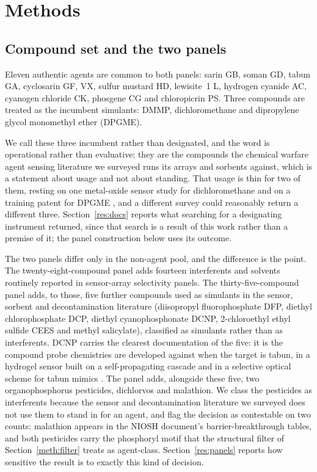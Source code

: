 \documentclass[1p,times]{elsarticle}
\begin{document}
\section{Methods}

\subsection{Compound set and the two panels}
\label{meth:panels}
Eleven authentic agents are common to both panels: sarin GB, soman GD, tabun GA,
cyclosarin GF, VX, sulfur mustard HD, lewisite~1 L, hydrogen cyanide AC,
cyanogen chloride CK, phosgene CG and chloropicrin PS. Three compounds are
treated as the incumbent simulants: DMMP, dichloromethane and dipropylene glycol
monomethyl ether (DPGME).

We call these three incumbent rather than designated, and the word is
operational rather than evaluative: they are the compounds the chemical warfare
agent sensing literature we surveyed runs its arrays and sorbents against, which
is a statement about usage and not about standing. That usage is thin for two of
them, resting on one metal-oxide sensor study for dichloromethane
\cite{lee2011sno2} and on a training patent for DPGME
\cite{seitzinger2006simulant}, and a different survey could reasonably return a
different three. Section~\ref{res:docs} reports what searching for a designating
instrument returned, since that search is a result of this work rather than a
premise of it; the panel construction below uses its outcome.

The two panels differ only in the non-agent pool, and the difference is the
point. The twenty-eight-compound panel adds fourteen interferents and solvents
routinely reported in sensor-array selectivity panels. The
thirty-five-compound panel adds, to those, five further compounds used as
simulants in the sensor, sorbent and decontamination literature (diisopropyl
fluorophosphate DFP, diethyl chlorophosphate DCP, diethyl cyanophosphonate DCNP\cite{lee2021tabun,jang2014tabun},
2-chloroethyl ethyl sulfide CEES and methyl salicylate), classified as simulants
rather than as interferents. DCNP carries the clearest documentation of the
five: it is the compound probe chemistries are developed against when the
target is tabun, in a hydrogel sensor built on a self-propagating cascade
\cite{lee2021tabun} and in a selective optical scheme for tabun mimics
\cite{jang2014tabun}. The panel adds, alongside these five, two
organophosphorus pesticides,
dichlorvos and malathion. We class the pesticides as interferents because the
sensor and decontamination literature we surveyed does not use them to stand in
for an agent, and flag the decision as contestable on two counts: malathion
appears in the NIOSH document's barrier-breakthrough tables, and both pesticides carry the
phosphoryl motif that the structural filter of Section~\ref{meth:filter} treats
as agent-class.
Section~\ref{res:panels} reports how sensitive the result is to exactly this
kind of decision.
\end{document}
